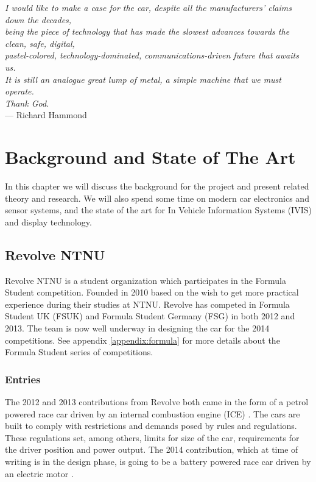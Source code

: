 
\begin{flushright}{\slshape 
	I would like to make a case for the car, despite all the manufacturers' 
	claims down the decades,\\
	being the piece of technology that has made the slowest advances 
	towards the clean, safe, digital,\\
	pastel-colored, technology-dominated, communications-driven future that 
	awaits us.\\
	It is still an analogue great lump of metal, a simple machine that we 
	must operate. \\
	Thank God.} \\ \medskip
		--- Richard Hammond \cite{Hammond} 
\end{flushright}


\bigskip

\begingroup
\let\clearpage\relax
\let\cleardoublepage\relax
\let\cleardoublepage\relax


\chapter{Background and State of The Art}

In this chapter we will discuss the background for the project and present 
related theory and research.
We will also spend some time on modern car electronics and sensor systems, and the state of the art for
In Vehicle Information Systems (IVIS) and display technology.
\\
\section{Revolve NTNU}
Revolve NTNU is a student organization which participates in the Formula 
Student competition. Founded in 2010 based on the wish to get more practical 
experience during their studies at NTNU. \cite{Revolve:history} Revolve has competed in Formula Student 
UK (FSUK) and Formula Student Germany (FSG) in both 2012 and 2013. The team is now 
well underway in designing the car for the 2014 competitions. See appendix
\vref{appendix:formula}
for more details about the Formula Student series of competitions.


\subsection{Entries}
The 2012 and 2013 contributions from Revolve both came in the form of a petrol powered race car driven by an internal combustion engine (ICE)
 \cite{Revolve:car13}.
The cars are built to comply with restrictions and demands posed by rules and 
regulations. These regulations set, among others, limits for size of the car, 
requirements for the driver position and power output.
The 2014 contribution, which at time of writing is in the design phase, is going to be a battery powered race car driven by an electric motor \cite{Revolve:car14}.

